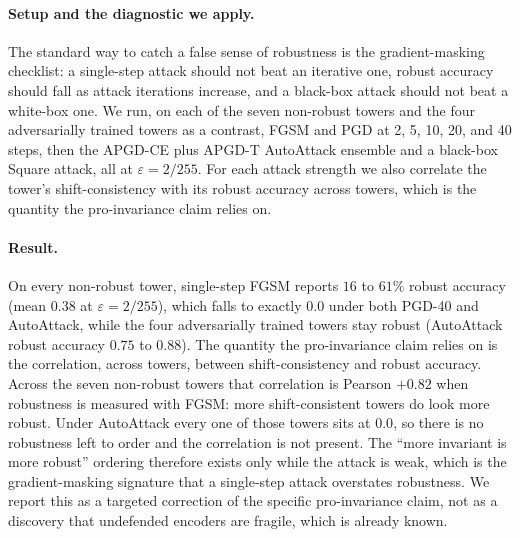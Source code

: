 \documentclass{article}
\begin{document}
\paragraph{Setup and the diagnostic we apply.}
The standard way to catch a false sense of robustness is the gradient-masking checklist: a single-step
attack should not beat an iterative one, robust accuracy should fall as attack iterations increase, and
a black-box attack should not beat a white-box one. We run, on each of the seven non-robust towers and
the four adversarially trained towers as a contrast, FGSM and PGD at 2, 5, 10, 20, and 40 steps, then
the APGD-CE plus APGD-T AutoAttack ensemble and a black-box Square attack, all at $\varepsilon=2/255$.
For each attack strength we also correlate the tower's shift-consistency with its robust accuracy
across towers, which is the quantity the pro-invariance claim relies on.

\paragraph{Result.}
On every non-robust tower, single-step FGSM reports $16$ to $61\%$ robust accuracy (mean $0.38$ at
$\varepsilon=2/255$), which falls to exactly $0.0$ under both PGD-40 and AutoAttack, while the four
adversarially trained towers stay robust (AutoAttack robust accuracy $0.75$ to $0.88$). The quantity
the pro-invariance claim relies on is the correlation, across towers, between shift-consistency and
robust accuracy. Across the seven non-robust towers that correlation is Pearson $+0.82$ when robustness
is measured with FGSM: more shift-consistent towers do look more robust. Under AutoAttack every one of
those towers sits at $0.0$, so there is no robustness left to order and the correlation is not present.
The ``more invariant is more robust'' ordering therefore exists only while the attack is weak, which is
the gradient-masking signature that a single-step attack overstates robustness. We report this as a
targeted correction of the specific pro-invariance claim, not as a discovery that undefended encoders
are fragile, which is already known.
\end{document}
